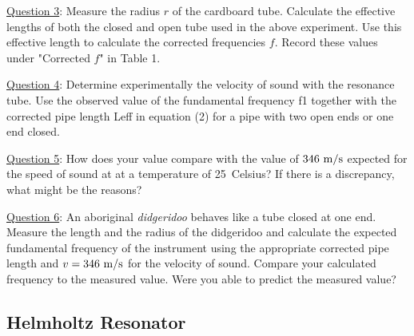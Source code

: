 \documentclass[11pt]{NSF}
\begin{document}
\underline{Question 3}: Measure the radius $r$ of the cardboard tube. Calculate the effective lengths of both the closed and open
tube used in the above experiment. Use this effective length to calculate the corrected frequencies $f$. Record these values under "Corrected $f$" in Table 1.

\underline{Question 4}: Determine experimentally the velocity of sound with the resonance tube. Use the observed value
of the fundamental frequency f1 together with the corrected pipe length Leff in equation (2) for a
pipe with two open ends or one end closed. 

\underline{Question 5}: How does your value compare with the value of 
$346~{\rm m/s}$ expected for the speed of sound at
at a temperature of 25~Celsius?
If there is a discrepancy, what might be the reasons?


\underline{Question 6}: An aboriginal {\em didgeridoo} behaves like a tube closed at one end.
Measure the length and the radius of the didgeridoo and calculate the expected fundamental frequency of the instrument
using the appropriate corrected pipe length and $v=346~{\rm m/s}$
for the velocity of sound. Compare your calculated frequency to the measured value. Were you able to predict the measured value?
\subsection{Helmholtz Resonator}
\end{document}

